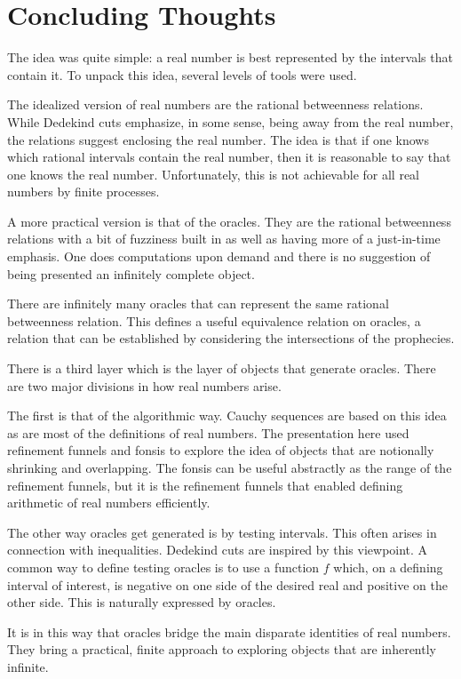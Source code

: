 \documentclass[12pt]{article}
\begin{document}
\section{Concluding Thoughts}

The idea was quite simple:  a real number is best represented by the intervals that contain it. To unpack this idea, several levels of tools were used.

The idealized version of real numbers are the rational betweenness relations. While Dedekind cuts emphasize, in some sense, being away from the real number, the relations suggest enclosing the real number. The idea is that if one knows which rational intervals contain the real number, then it is reasonable to say that one knows the real number. Unfortunately, this is not achievable for all real numbers by finite processes. 

A more practical version is that of the oracles. They are the rational betweenness relations with a bit of fuzziness built in as well as having more of a just-in-time emphasis. One does computations upon demand and there is no suggestion of being presented an infinitely complete object. 

There are infinitely many oracles that can represent the same rational betweenness relation. This defines a useful equivalence relation on oracles, a relation that can be established by considering the intersections of the prophecies. 

There is a third layer which is the layer of objects that generate oracles. There are two major divisions in how real numbers arise. 

The first is that of the algorithmic way. Cauchy sequences are based on this idea as are most of the definitions of real numbers. The presentation here used refinement funnels and fonsis to explore the idea of objects that are notionally shrinking and overlapping. The fonsis can be useful abstractly as the range of the refinement funnels, but it is the refinement funnels that enabled defining arithmetic of real numbers efficiently. 

The other way oracles get generated is by testing intervals. This often arises in connection with inequalities. Dedekind cuts are inspired by this viewpoint. A common way to define testing oracles is to use a function $f$ which, on a defining interval of interest, is negative on one side of the desired real and positive on the other side. This is naturally expressed by oracles. 

It is in this way that oracles bridge the main disparate identities of real numbers. They bring a practical, finite approach to exploring objects that are inherently infinite. 
\end{document}
